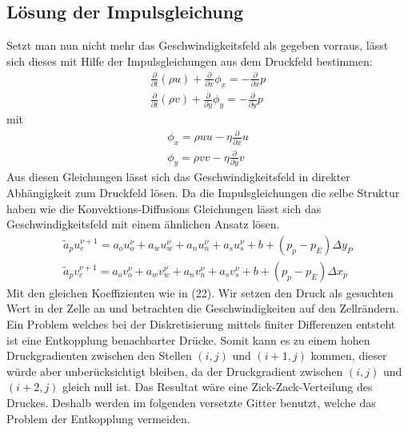 \documentclass{article}
\newcommand{\ddt}{\frac{\partial }{\partial t}}
\newcommand{\ddx}{\frac{\partial }{\partial x}}
\newcommand{\ddy}{\frac{\partial }{\partial y}}
\begin{document}
\subsection{Lösung der Impulsgleichung}
Setzt man nun nicht mehr das Geschwindigkeitsfeld als gegeben vorraus, lässt sich dieses
mit Hilfe der Impulsgleichungen aus dem Druckfeld bestimmen:
\begin{align}
\ddt(\rho u) +\ddx\phi_x = -\ddx p \\
\ddt(\rho v) +\ddy\phi_y = -\ddy p 
\end{align}
mit 
\begin{align}
\phi_x = \rho u u - \eta \ddx u\\
\phi_y = \rho v v - \eta \ddy v
\end{align}
Aus diesen Gleichungen lässt sich das Geschwindigkeitsfeld in direkter Abhängigkeit zum Druckfeld lösen.
Da die Impulsgleichungen die selbe Struktur haben wie die Konvektions-Diffusions Gleichungen lässt sich
das Geschwindigkeitsfeld mit einem ähnlichen Ansatz lösen.
\begin{align}
\tilde{a}_p u_e^{\nu+1}= a_o u^{\nu}_o+a_w u^{\nu}_w +a_n u^{\nu}_n +a_s u^{\nu}_s +b +(p_p-p_E)\Delta y_P\\
\tilde{a}_p v_e^{\nu+1}= a_o v^{\nu}_o+a_w v^{\nu}_w +a_n v^{\nu}_n +a_s v^{\nu}_s +b +(p_p-p_E)\Delta x_p
\end{align}
Mit den gleichen Koeffizienten wie in (22).
Wir setzen den Druck als gesuchten Wert in der Zelle an und betrachten die Geschwindigkeiten
auf den Zellrändern. Ein Problem welches bei der Diskretisierung mittels finiter Differenzen entsteht
ist eine Entkopplung benachbarter Drücke. Somit kann es zu einem hohen Druckgradienten zwischen den Stellen
$(i,j)$ und $(i+1,j)$ kommen, dieser würde aber unberücksichtigt bleiben, da der Druckgradient
zwischen $(i,j)$ und $(i+2,j)$  gleich null ist. Das Resultat wäre eine Zick-Zack-Verteilung des Druckes. Deshalb werden im folgenden versetzte Gitter benutzt, welche das Problem
der Entkopplung vermeiden.\\
\end{document}
